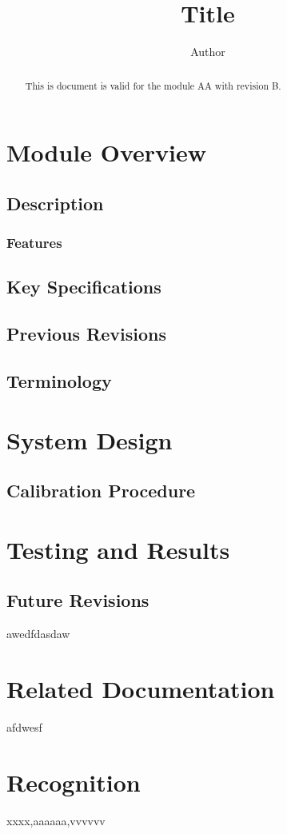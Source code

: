 \documentclass[12pt]{article}
\begin{document}
\title{Title}
\author{Author}
\maketitle

\begin{abstract}
This is document is valid for the module AA with revision B.
\end{abstract} 

\section*{Module Overview}

\subsection*{Description}

\subsubsection*{Features}

\subsection*{Key Specifications}

\subsection*{Previous Revisions}

\subsection*{Terminology}

\section*{System Design}

\subsection*{Calibration Procedure}

\section*{Testing and Results}

\subsection*{Future Revisions}
awedfdasdaw

\section*{Related Documentation}
afdwesf

\section*{Recognition}
xxxx,aaaaaa,vvvvvv
\end{document}
